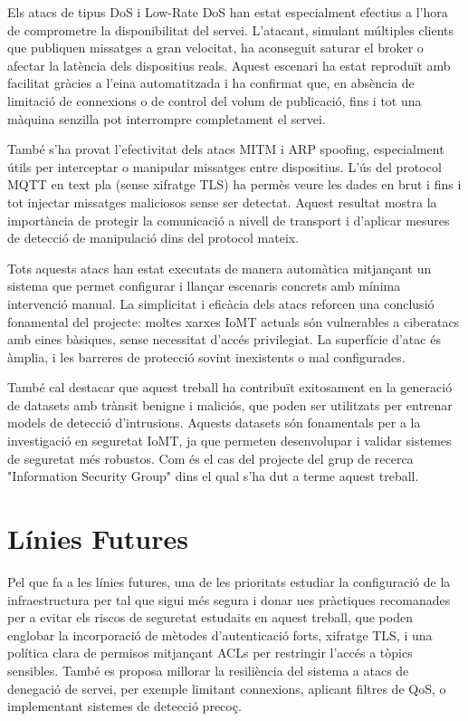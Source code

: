 Els atacs de tipus DoS i Low-Rate DoS han estat especialment efectius a l’hora de comprometre la disponibilitat del servei. L’atacant, simulant múltiples clients que publiquen missatges a gran velocitat, ha aconseguit saturar el broker o afectar la latència dels dispositius reals. Aquest escenari ha estat reproduït amb facilitat gràcies a l’eina automatitzada i ha confirmat que, en absència de limitació de connexions o de control del volum de publicació, fins i tot una màquina senzilla pot interrompre completament el servei.

També s’ha provat l’efectivitat dels atacs MITM i ARP spoofing, especialment útils per interceptar o manipular missatges entre dispositius. L’ús del protocol MQTT en text pla (sense xifratge TLS) ha permès veure les dades en brut i fins i tot injectar missatges maliciosos sense ser detectat. Aquest resultat mostra la importància de protegir la comunicació a nivell de transport i d’aplicar mesures de detecció de manipulació dins del protocol mateix.

Tots aquests atacs han estat executats de manera automàtica mitjançant un sistema que permet configurar i llançar escenaris concrets amb mínima intervenció manual. La simplicitat i eficàcia dels atacs reforcen una conclusió fonamental del projecte: moltes xarxes IoMT actuals són vulnerables a ciberatacs amb eines bàsiques, sense necessitat d'accés privilegiat. La superfície d’atac és àmplia, i les barreres de protecció sovint inexistents o mal configurades.

També cal destacar que aquest treball ha contribuït exitosament en la generació de datasets amb trànsit benigne i maliciós, que poden ser utilitzats per entrenar models de detecció d’intrusions. Aquests datasets són fonamentals per a la investigació en seguretat IoMT, ja que permeten desenvolupar i validar sistemes de seguretat més robustos. Com és el cas del projecte del grup de recerca "Information Security Group" dins el qual s'ha dut a terme aquest treball.


\section{Línies Futures}

Pel que fa a les línies futures, una de les prioritats estudiar la configuració de la infraestructura per tal que sigui més segura i donar ues pràctiques recomanades per a evitar els riscos de seguretat estudaits en aquest treball, que poden englobar la incorporació de mètodes d’autenticació forts, xifratge TLS, i una política clara de permisos mitjançant ACLs per restringir l’accés a tòpics sensibles. També es proposa millorar la resiliència del sistema a atacs de denegació de servei, per exemple limitant connexions, aplicant filtres de QoS, o implementant sistemes de detecció precoç.


